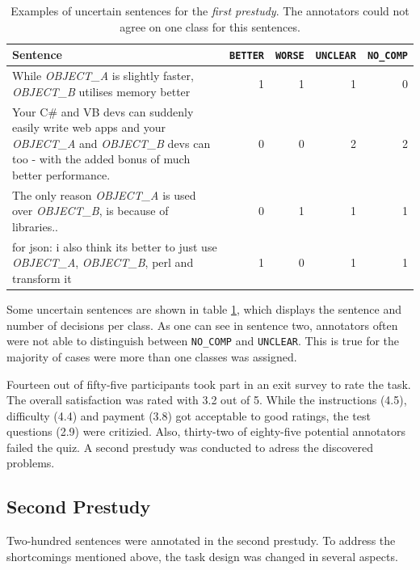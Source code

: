 \begin{table}[tbp]
\centering
\caption{Examples of uncertain sentences for the \emph{first prestudy}. The annotators could not agree on one class for this sentences. }
\label{tbl:pre_1_res}
\begin{tabularx}{\textwidth}{Xrrrr}
\toprule
 Sentence        & \texttt{BETTER} & \texttt{WORSE} & \texttt{UNCLEAR} & \texttt{NO\_COMP}          \\ \midrule

While \emph{OBJECT\_A} is slightly faster, \emph{OBJECT\_B} utilises memory better & 1 & 1 & 1 & 0 \\

Your C\# and VB devs can suddenly easily write web apps and your \emph{OBJECT\_A} and \emph{OBJECT\_B} devs can too - with the added bonus of much better performance. & 0 & 0 & 2 & 2 \\

The only reason \emph{OBJECT\_A} is used over \emph{OBJECT\_B}, is because of libraries.. & 0 & 1 & 1 & 1 \\

for json: i also think its better to just use \emph{OBJECT\_A}, \emph{OBJECT\_B}, perl and transform it & 1 & 0 & 1 & 1 \\

\bottomrule                              
\end{tabularx}
\end{table}


Some uncertain sentences are shown in table \ref{tbl:pre_1_res}, which displays the sentence and number of decisions per class. As one can see in sentence two, annotators often were not able to distinguish between \texttt{NO\_COMP} and \texttt{UNCLEAR}. This is true for the majority of cases were more than one classes was assigned.



Fourteen out of fifty-five participants took part in an exit survey to rate the task. The overall satisfaction was rated with 3.2 out of 5. While the instructions (4.5), difficulty (4.4) and payment (3.8) got acceptable to good ratings, the test questions (2.9) were critizied. Also, thirty-two of eighty-five potential annotators failed the quiz. A second prestudy was conducted to adress the discovered problems.


\FloatBarrier
\subsection{Second Prestudy}
Two-hundred sentences were annotated in the second prestudy. To address the shortcomings mentioned above, the task design was changed in several aspects.

